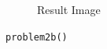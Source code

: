 \begin{figure}[h]
\begin{subfigure}[b]{0.5\textwidth}
        \caption{Result Image}
        \label{fig:image}
    \end{subfigure}
    \caption{\texttt{problem2b()}}
\end{figure}

